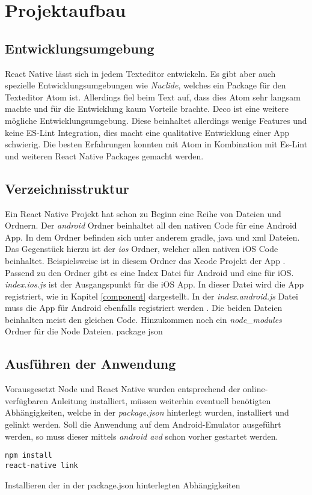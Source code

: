 \section{Projektaufbau}

\subsection{Entwicklungsumgebung}
React Native lässt sich in jedem Texteditor entwickeln. Es gibt aber auch spezielle Entwicklungsumgebungen wie \textit{Nuclide}, welches ein Package für den Texteditor Atom ist. Allerdings fiel beim Text auf, dass dies Atom sehr langsam machte und für die Entwicklung kaum Vorteile brachte. Deco ist eine weitere mögliche Entwicklungsumgebung. Diese beinhaltet allerdings wenige Features und keine ES-Lint Integration, dies macht eine qualitative Entwicklung einer App schwierig. Die besten Erfahrungen konnten mit Atom in Kombination mit Es-Lint und weiteren React Native Packages gemacht werden. 

\subsection{Verzeichnisstruktur}
Ein React Native Projekt hat schon zu Beginn eine Reihe von Dateien und Ordnern. Der \textit{android} Ordner beinhaltet all den nativen Code für eine Android App. In dem Ordner befinden sich unter anderem gradle, java und xml Dateien. Das Gegenstück hierzu ist der \textit{ios} Ordner, welcher allen nativen iOS Code beinhaltet. Beispielsweise ist in diesem Ordner das Xcode Projekt der App \cite{carli_project_2016}. Passend zu den Ordner gibt es eine Index Datei für Android und eine für iOS. \textit{index.ios.js} ist der Ausgangspunkt für die iOS App. In dieser Datei wird die App registriert, wie in Kapitel \ref{component} dargestellt. In der \textit{index.android.js} Datei muss die App für Android ebenfalls registriert werden \cite{carli_project_2016}. Die beiden Dateien beinhalten meist den gleichen Code. Hinzukommen noch ein \textit{node\_modules} Ordner für die Node Dateien. 
package json



\subsection{Ausführen der Anwendung}
Vorausgesetzt Node und React Native wurden entsprechend der online-verfügbaren Anleitung installiert, müssen weiterhin eventuell benötigten Abhängigkeiten, welche in der \textit{package.json} hinterlegt wurden, installiert und gelinkt werden. Soll die Anwendung auf dem Android-Emulator ausgeführt werden, so muss dieser mittels \textit{android avd} schon vorher gestartet werden.
\begin{listing}[H]
    \begin{verbatim}
npm install
react-native link
    \end{verbatim}
    \caption{Installieren der in der package.json hinterlegten Abhängigkeiten}
    \label{lst:install_dependencies}
\end{listing}

